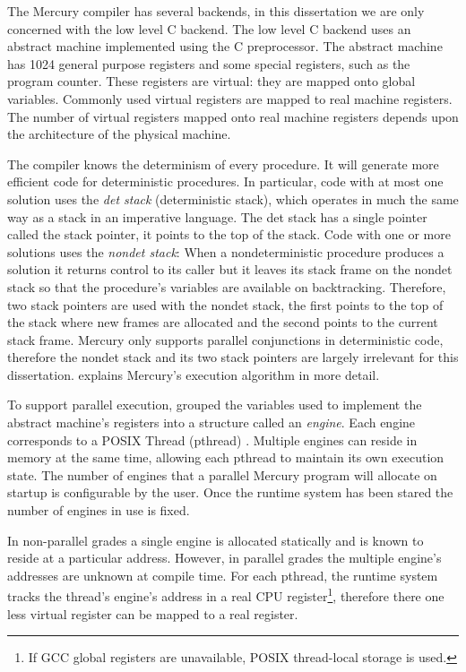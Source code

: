 
The Mercury compiler has several backends,
in this dissertation we are only concerned with the low level C backend.
The low level C backend uses an abstract machine implemented using the C
preprocessor.
The abstract machine has 1024 general purpose registers and some
special registers, such as the program counter.
These registers are virtual:
they are mapped onto global variables.
Commonly used virtual registers are mapped to real machine registers.
The number of virtual registers mapped onto real machine registers depends upon
the architecture of the physical machine.

The compiler knows the determinism of every procedure.
It will generate more efficient code for deterministic procedures.
In particular,
code with at most one solution uses the \emph{det stack} (deterministic
stack),
which operates in much the same way as a stack in an imperative
language.
The det stack has a single pointer called the stack pointer,
it points to the top of the stack.
Code with one or more solutions uses the \emph{nondet stack}:
When a nondeterministic procedure produces a solution it returns control to
its caller but
it leaves its stack frame on the nondet stack so that
the procedure's variables are available on backtracking.
Therefore,
two stack pointers are used with the nondet stack,
the first points to the top of the stack where new frames are allocated
and the second points to the current stack frame.
Mercury only supports parallel conjunctions in deterministic code,
therefore the nondet stack and its two stack pointers are largely irrelevant
for this dissertation.
\citet*{mercury_jlp} explains Mercury's execution algorithm in more detail.

\label{page:engine}
To support parallel execution,
\citet*{conway:2002:par} grouped the variables used to implement the abstract
machine's registers into a structure called an \emph{engine}.
Each engine corresponds to a POSIX Thread (pthread)
\citep{butenhof1997:pthreads}.
Multiple engines can reside in memory at the same time,
allowing each pthread to maintain its own execution state.
The number of engines that a parallel Mercury program will allocate on startup
is configurable by the user.
Once the runtime system has been stared the number of engines in use is
fixed.

In non-parallel grades a single engine is allocated statically and is known
to reside at a particular address.
However,
in parallel grades the multiple engine's addresses are unknown at compile
time.
For each pthread,
the runtime system tracks the thread's engine's address in a real CPU
register\footnote{
    If GCC global registers are unavailable,
    POSIX thread-local storage is used.
},
therefore there one less virtual register can be mapped to a real register.

